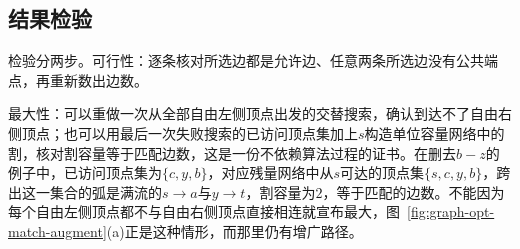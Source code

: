 \subsection{结果检验}
\label{sec:graph-opt-match-analysis}

检验分两步。可行性：逐条核对所选边都是允许边、任意两条所选边没有公共端点，再重新数出边数。

最大性：可以重做一次从全部自由左侧顶点出发的交替搜索，确认到达不了自由右侧顶点；也可以用最后一次失败搜索的已访问顶点集加上$s$构造单位容量网络中的割，核对割容量等于匹配边数，这是一份不依赖算法过程的证书。在删去$b-z$的例子中，已访问顶点集为$\{c,y,b\}$，对应残量网络中从$s$可达的顶点集$\{s,c,y,b\}$，跨出这一集合的弧是满流的$s\to a$与$y\to t$，割容量为$2$，等于匹配的边数。不能因为每个自由左侧顶点都不与自由右侧顶点直接相连就宣布最大，图~\ref{fig:graph-opt-match-augment}(a)正是这种情形，而那里仍有增广路径。
